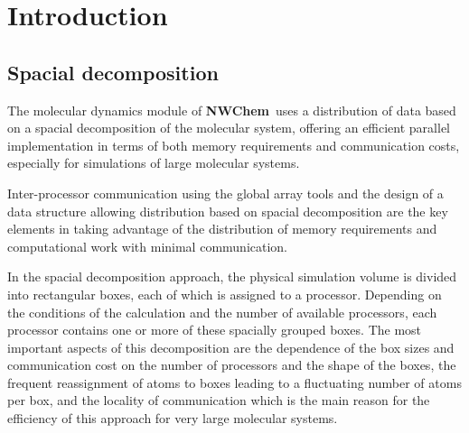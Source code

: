 \label{sec:nwmd}
\newcommand{\mc}[3]{\mbox{\bf #3}}
\newcommand{\vb}[1]{\mbox{\verb.#1.}}
\newcommand{\none}{\multicolumn{2}{|c|}{ }}
\newcommand{\mcc}[1]{\multicolumn{2}{c}{#1}}
\def\bmu{\mbox{\boldmath $\mu$}}
\def\bE{\mbox{\bf E}}
\def\br{\mbox{\bf r}}
\def\tT{\tilde{T}}
\def\t{\tilde{1}}
\def\ip{i\prime}
\def\jp{j\prime}
\def\ipp{i\prime\prime}
\def\jpp{j\prime\prime}
\def\etal{{\sl et al.}}
\def\nwchem{{\bf NWChem}}
\def\prepare{{\bf prepare}}
\def\nwtop{{\bf nwtop}}
\def\nwrst{{\bf nwrst}}
\def\nwsgm{{\bf nwsgm}}

\section{Introduction}

\subsection{Spacial decomposition}
The molecular dynamics module of \nwchem\ uses a distribution of data
based on a spacial decomposition of the molecular system, offering
an efficient parallel implementation in terms of both memory 
requirements and communication costs, especially for simulations of 
large molecular systems.

Inter-processor communication using the global array tools and the
design of a data structure allowing distribution based on spacial
decomposition are the key elements in taking advantage of
the distribution of memory requirements and computational work with
minimal communication.

In the spacial decomposition approach, the physical simulation
volume is divided into rectangular boxes, each of which is
assigned to a processor. Depending on the conditions of the 
calculation and the number of available processors, each processor 
contains one or more of these spacially grouped boxes.
The most important aspects of this decomposition are the dependence 
of the box sizes and communication cost on the number of processors 
and the shape of the boxes, the frequent reassignment of atoms to 
boxes leading to a fluctuating number of atoms per box, and the 
locality of communication which is the main reason for the efficiency 
of this approach for very large molecular systems.

